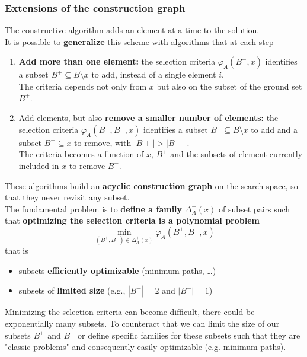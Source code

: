 \newpage

\subsubsection{Extensions of the construction graph}
The constructive algorithm adds an element at a time to the solution.\\

It is possible to \textbf{generalize} this scheme with algorithms that at each step
\begin{enumerate}
	\item \textbf{Add more than one element:} the selection criteria $\varphi_A (B^+, x)$ identifies a subset $B^+ \subseteq B \setminus x$ to add, instead of a single element $i$. \\
	The criteria depends not only from $x$ but also on the subset of the ground set $B^+$.\\
	
	\item Add elements, but also \textbf{remove a smaller number of elements:} the selection criteria $\varphi_A (B^+, B^-, x)$ identifies a subset $B^+ \subseteq B \setminus x$ to add and a subset $B^- \subseteq x$ to remove, with $|B+| > |B-|$. \\
	The criteria becomes a function of $x$, $B^+$ and the subsets of element currently included in $x$ to remove $B^-$.\\
\end{enumerate}

These algorithms build an \textbf{acyclic construction graph} on the search space, so that they never revisit any subset.\\

The fundamental problem is to \textbf{define a family} $\Delta_A^+ (x)$ of subset pairs such that \textbf{optimizing the selection criteria is a polynomial problem}
$$ \min_{(B^+, B^-) \in \Delta_A^+ (x)} \varphi_A (B^+, B^-, x) $$
that is
\begin{itemize}
	\item subsets \textbf{efficiently optimizable} (minimum paths, \dots)
	\item subsets of \textbf{limited size} (e.g., $|B^+| = 2$ and $|B^-| = 1$)
\end{itemize}

Minimizing the selection criteria can become difficult, there could be exponentially many subsets. To counteract that we can limit the size of our subsets $B^+$ and $B^-$ or define specific families for these subsets such that they are "classic problems" and consequently easily optimizable (e.g. minimum paths).\\


